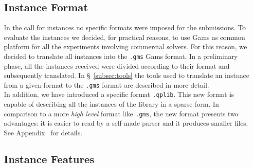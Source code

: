 \subsection{Instance Format}\label{subsec:format}
In the call for instances no specific formats were imposed
for the submissions.
To evaluate the instances we decided, for practical reasons, to use Gams as common platform for all the experiments involving commercial solvers.
For this reason, we decided to translate all instances into the \texttt{.gms} Gams format.
 In a preliminary phase, all the instances received were divided according to their format and subsequently translated.
In \S~\ref{subsec:tools}
the tools used
to translate an instance from a given format to the \texttt{.gms} format
are described in more detail.\\

In addition, we have introduced
a specific format \texttt{.qplib}. This new format is capable of describing
all the instances of the library in a sparse form.
In comparison to a more \emph{high level} format like \texttt{.gms}, the new
format presents two advantages:
it is easier to read by a self-made parser and it produces smaller files.
See Appendix~\label{sec:format} for details.





\subsection{Instance Features}\label{subsec:feature}

%

